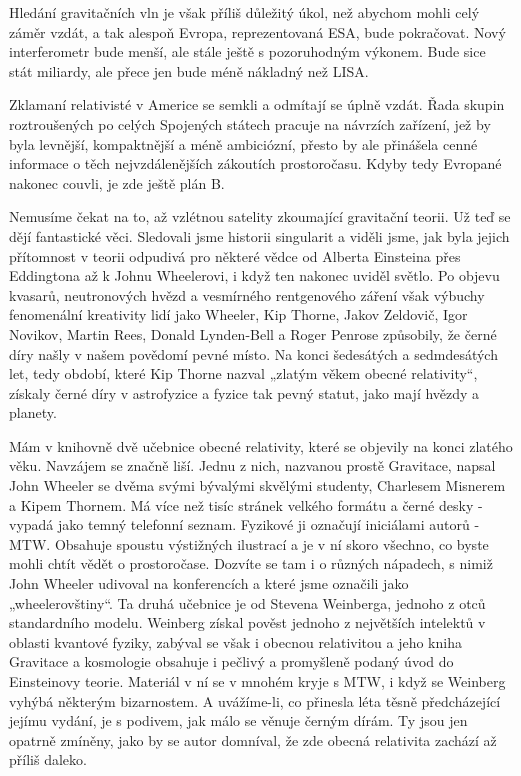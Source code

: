   Hledání gravitačních vln je však příliš důležitý úkol, než abychom mohli celý záměr vzdát, a tak
  alespoň Evropa, reprezentovaná ESA, bude pokračovat. Nový interferometr bude menší, ale stále
  ještě s pozoruhodným výkonem. Bude sice stát miliardy, ale přece jen bude méně nákladný než LISA.
  
  Zklamaní relativisté v Americe se semkli a odmítají se úplně vzdát. Řada skupin roztroušených po
  celých Spojených státech pracuje na návrzích zařízení, jež by byla levnější, kompaktnější a méně
  ambiciózní, přesto by ale přinášela cenné informace o těch nejvzdálenějších zákoutích
  prostoročasu. Kdyby tedy Evropané nakonec couvli, je zde ještě plán B. 
  
  Nemusíme čekat na to, až vzlétnou satelity zkoumající gravitační teorii. Už teď se dějí
  fantastické věci. Sledovali jsme historii singularit a viděli jsme, jak byla jejich přítomnost v
  teorii odpudivá pro některé vědce od Alberta Einsteina přes Eddingtona až k Johnu Wheelerovi, i
  když ten nakonec uviděl světlo. Po objevu kvasarů, neutronových hvězd a vesmírného rentgenového
  záření však výbuchy fenomenální kreativity lidí jako Wheeler, Kip Thorne, Jakov Zeldovič, Igor
  Novikov, Martin Rees, Donald Lynden-Bell a Roger Penrose způsobily, že černé díry našly v našem
  povědomí pevné místo. Na konci šedesátých a sedmdesátých let, tedy období, které Kip Thorne nazval
  „zlatým věkem obecné relativity“, získaly černé díry v astrofyzice a fyzice tak pevný statut, jako
  mají hvězdy a planety. 
  
  Mám v knihovně dvě učebnice obecné relativity, které se objevily na konci zlatého věku. Navzájem
  se značně liší. Jednu z nich, nazvanou prostě Gravitace, napsal John Wheeler se dvěma svými
  bývalými skvělými studenty, Charlesem Misnerem a Kipem Thornem. Má více než tisíc stránek velkého
  formátu a černé desky - vypadá jako temný telefonní seznam. Fyzikové ji označují iniciálami autorů
  - MTW. Obsahuje spoustu výstižných ilustrací a je v ní skoro všechno, co byste mohli chtít vědět o
  prostoročase. Dozvíte se tam i o různých nápadech, s nimiž John Wheeler udivoval na konferencích a
  které jsme označili jako „wheelerovštiny“. Ta druhá učebnice je od Stevena Weinberga, jednoho z
  otců standardního modelu. Weinberg získal pověst jednoho z největších intelektů v oblasti kvantové
  fyziky, zabýval se však i obecnou relativitou a jeho kniha Gravitace a kosmologie obsahuje i
  pečlivý a promyšleně podaný úvod do Einsteinovy teorie. Materiál v ní se v mnohém kryje s MTW, i
  když se Weinberg vyhýbá některým bizarnostem. A uvážíme-li, co přinesla léta těsně předcházející
  jejímu vydání, je s podivem, jak málo se věnuje černým dírám. Ty jsou jen opatrně zmíněny, jako by
  se autor domníval, že zde obecná relativita zachází až příliš daleko. 
  
